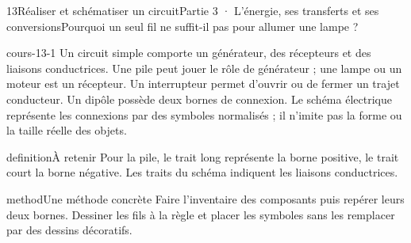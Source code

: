 \documentclass[12pt,twoside,openany]{book}
\begin{document}
\clearpage\pagestyle{otMain}
\begin{ouverture}[college3]{13}{Réaliser et schématiser un circuit}{Partie 3 · L’énergie, ses transferts et ses conversions}{Pourquoi un seul fil ne suffit-il pas pour allumer une lampe ?}
\end{ouverture}
\label{ch-13-cours-1}
\label{ess-13}
\begin{pcFiche}{cours-13-1}
Un circuit simple comporte un générateur, des récepteurs et des liaisons conductrices. Une pile peut jouer le rôle de générateur ; une lampe ou un moteur est un récepteur. Un interrupteur permet d’ouvrir ou de fermer un trajet conducteur. Un dipôle possède deux bornes de connexion. Le schéma électrique représente les connexions par des symboles normalisés ; il n’imite pas la forme ou la taille réelle des objets.\par
{}
\begin{pcEncadre}{definition}{À retenir}
Pour la pile, le trait long représente la borne positive, le trait court la borne négative. Les traits du schéma indiquent les liaisons conductrices.\par
\end{pcEncadre}
\begin{pcEncadre}{method}{Une méthode concrète}
Faire l’inventaire des composants puis repérer leurs deux bornes. Dessiner les fils à la règle et placer les symboles sans les remplacer par des dessins décoratifs.\par
\end{pcEncadre}
\end{pcFiche}
\label{ch-13-cours-2}
\end{document}
